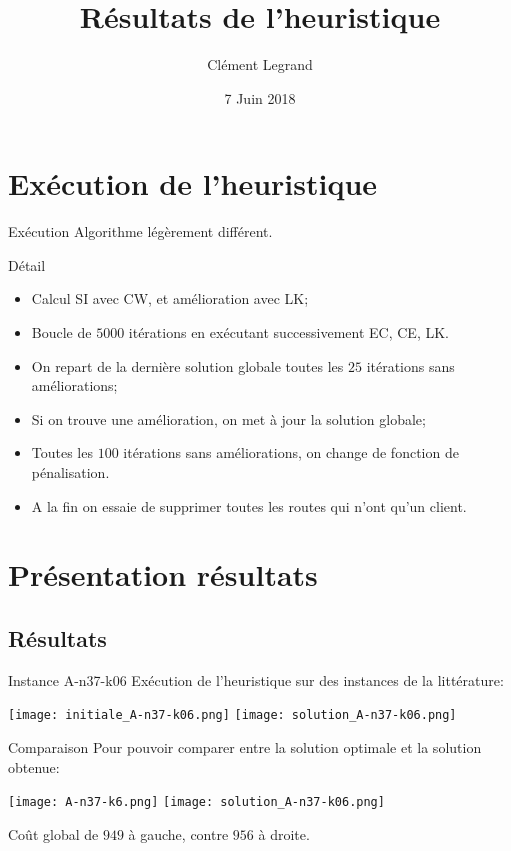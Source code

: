 \documentclass{beamer}
\title{Résultats de l'heuristique}
\author{Clément Legrand}
\date{7 Juin 2018}
\begin{document}
\section{Exécution de l'heuristique}

\begin{frame}[plain]
\titlepage
\end{frame}

\begin{frame}{Exécution}
Algorithme légèrement différent.
\begin{block}{Détail}
\begin{itemize}
\item Calcul SI avec CW, et amélioration avec LK;
\item Boucle de $5000$ itérations en exécutant successivement EC, CE, LK.
\item On repart de la dernière solution globale toutes les $25$ itérations sans améliorations;
\item Si on trouve une amélioration, on met à jour la solution globale;
\item Toutes les $100$ itérations sans améliorations, on change de fonction de pénalisation.
\item A la fin on essaie de supprimer toutes les routes qui n'ont qu'un client.
\end{itemize}
\end{block}
\end{frame}

\section{Présentation résultats}

\subsection{Résultats}

\begin{frame}{Instance A-n37-k06}
Exécution de l'heuristique sur des instances de la littérature:
\begin{center}
\texttt{[image: initiale\_A-n37-k06.png]}
\texttt{[image: solution\_A-n37-k06.png]}
\end{center}

\end{frame}

\begin{frame}{Comparaison}
Pour pouvoir comparer entre la solution optimale et la solution obtenue:
\begin{center}
\texttt{[image: A-n37-k6.png]}
\texttt{[image: solution\_A-n37-k06.png]}
\end{center}
Coût global de $949$ à gauche, contre $956$ à droite.
\end{frame}
\end{document}
